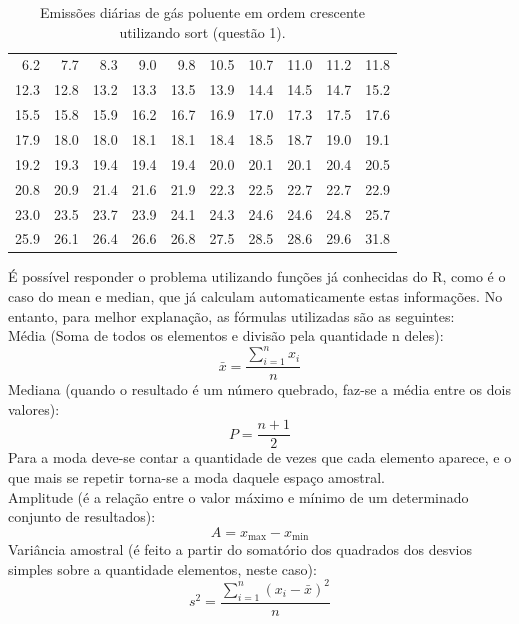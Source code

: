 \documentclass[12pt,a4paper]{article}
\begin{document}
\begin{table}[!h]
\centering
\begin{tabular}{rrrrrrrrrr}
6.2 & 7.7 & 8.3 & 9.0 & 9.8 & 10.5 & 10.7 & 11.0 & 11.2 & 11.8 \\
12.3 & 12.8 & 13.2 & 13.3 & 13.5 & 13.9 & 14.4 & 14.5 & 14.7 & 15.2 \\
15.5 & 15.8 & 15.9 & 16.2 & 16.7 & 16.9 & 17.0 & 17.3 & 17.5 & 17.6 \\
17.9 & 18.0 & 18.0 & 18.1 & 18.1 & 18.4 & 18.5 & 18.7 & 19.0 & 19.1 \\
19.2 & 19.3 & 19.4 & 19.4 & 19.4 & 20.0 & 20.1 & 20.1 & 20.4 & 20.5 \\
20.8 & 20.9 & 21.4 & 21.6 & 21.9 & 22.3 & 22.5 & 22.7 & 22.7 & 22.9 \\
23.0 & 23.5 & 23.7 & 23.9 & 24.1 & 24.3 & 24.6 & 24.6 & 24.8 & 25.7 \\
25.9 & 26.1 & 26.4 & 26.6 & 26.8 & 27.5 & 28.5 & 28.6 & 29.6 & 31.8 \\
\end{tabular}
\caption{Emissões diárias de gás poluente em ordem crescente utilizando sort (questão 1).}
\end{table}
É possível responder o problema utilizando funções já conhecidas do R, como é o caso do mean e median, que já calculam automaticamente estas informações. No entanto, para melhor explanação, as fórmulas utilizadas são as seguintes:\\
Média (Soma de todos os elementos e divisão pela quantidade n deles):
\begin{equation} 
  \bar{x} = \frac{\sum_{i=1}^{n} x_i}{n} %
\end{equation}
Mediana (quando o resultado é um número quebrado, faz-se a média entre os dois valores):
\begin{equation}
    P = \frac{n + 1}{2}
  \end{equation}
Para a moda deve-se contar a quantidade de vezes que cada elemento aparece, e o que mais se repetir torna-se a moda daquele espaço amostral. \\
Amplitude (é a relação entre o valor máximo e mínimo de um determinado conjunto de resultados):
 \begin{equation}
    A = x_{\max} - x_{\min}
  \end{equation}
  Variância amostral (é feito a partir do somatório dos quadrados dos desvios simples sobre a quantidade elementos, neste caso):
  \begin{equation}
    s^2 = \frac{\sum_{i=1}^{n} (x_i - \bar{x})^2}{n}
  \end{equation}
\end{document}
